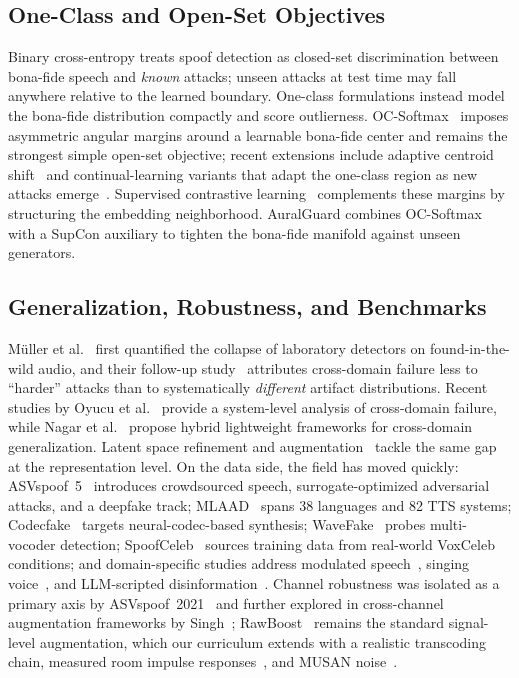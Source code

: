 \subsection{One-Class and Open-Set Objectives}
\label{ssec:related-oneclass}

Binary cross-entropy treats spoof detection as closed-set discrimination between
bona-fide speech and \emph{known} attacks; unseen attacks at test time may fall
anywhere relative to the learned boundary. One-class formulations instead model the
bona-fide distribution compactly and score outlierness.
OC-Softmax~\cite{zhang2021oneclass} imposes asymmetric angular margins around a
learnable bona-fide center and remains the strongest simple open-set objective; recent
extensions include adaptive centroid shift~\cite{kim2024oneclassknowledge} and
continual-learning variants that adapt the one-class region as new attacks
emerge~\cite{zhang2024remember}. Supervised contrastive learning~\cite{khosla2020supcon}
complements these margins by structuring the embedding neighborhood. AuralGuard
combines OC-Softmax with a SupCon auxiliary to tighten the bona-fide manifold against unseen generators.

\subsection{Generalization, Robustness, and Benchmarks}
\label{ssec:related-gen}

M{\"u}ller et al.~\cite{muller2022inthewild} first quantified the collapse of
laboratory detectors on found-in-the-wild audio, and their follow-up
study~\cite{muller2024harder} attributes cross-domain failure less to ``harder''
attacks than to systematically \emph{different} artifact distributions. Recent studies by Oyucu et al.~\cite{oyucu2026generalization} provide a system-level analysis of cross-domain failure, while Nagar et al.~\cite{nagar2026hybrid} propose hybrid lightweight frameworks for cross-domain generalization. Latent
space refinement and augmentation~\cite{wang2025latentrefine} tackle the same gap at
the representation level. On the data side, the field has moved quickly:
ASVspoof~5~\cite{wang2024asvspoof5,wang2025asvspoof5journal,duroselle2024data,schafer2024robust} introduces crowdsourced
speech, surrogate-optimized adversarial attacks, and a deepfake track;
MLAAD~\cite{muller2024mlaad} spans 38 languages and 82 TTS systems;
Codecfake~\cite{xie2025codecfake} targets neural-codec-based synthesis;
WaveFake~\cite{frank2021wavefake,mer2025wavefake} probes multi-vocoder detection;
SpoofCeleb~\cite{jung2025spoofceleb} sources training data from real-world VoxCeleb
conditions; and domain-specific studies address modulated speech~\cite{harsha2025modulated}, singing voice~\cite{zang2024singfake},
and LLM-scripted disinformation~\cite{luong2024llamapartialspoof}. Channel robustness
was isolated as a primary axis by ASVspoof~2021~\cite{liu2023asvspoof2021} and further explored in cross-channel augmentation frameworks by Singh~\cite{singh2026resilient};
RawBoost~\cite{tak2022rawboost} remains the standard signal-level augmentation, which
our curriculum extends with a realistic transcoding chain, measured room impulse
responses~\cite{ko2017rir}, and MUSAN noise~\cite{snyder2015musan}.

